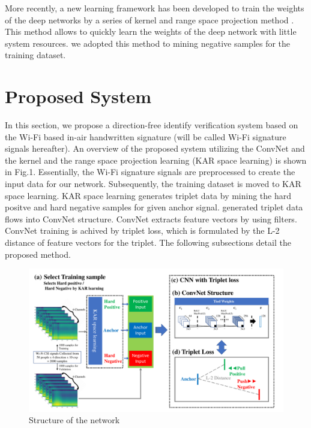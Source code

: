 \documentclass[runningheads]{llncs}
\begin{document}
More recently, a new learning framework has been developed to train the weights of the deep networks by a series of kernel and range space projection method \cite{toh2018learning,toh2018gradient}.
This method allows to quickly learn the weights of the deep network with little system resources.
we adopted this method to mining negative samples for the training dataset.

\section{Proposed System}

In this section, we propose a direction-free identify verification system based on the Wi-Fi based in-air handwritten signature (will be called Wi-Fi signature signals hereafter). An overview of the proposed system utilizing the ConvNet \cite{lecun1998gradient} and the kernel and the range space projection learning (KAR space learning) \cite{toh2018learning,toh2018gradient} is shown in Fig.1.
Essentially, the Wi-Fi signature signals are preprocessed to create the input data for our network. Subsequently, the training dataset is moved to KAR space learning. KAR space learning generates triplet data by mining the hard positve and hard negative samples for given anchor signal.
generated triplet data flows into ConvNet structure. ConvNet extracts feature vectors by using filters.
ConvNet training is achived by triplet loss, which is formulated by the L-2 distance of feature vectors for the triplet. 
The following subsections detail the proposed method.

\begin{figure}
    \includegraphics[width=\textwidth]{fig1_network_structure.pdf}
    \caption{Structure of the network} \label{fig1}
\end{figure}
\end{document}
